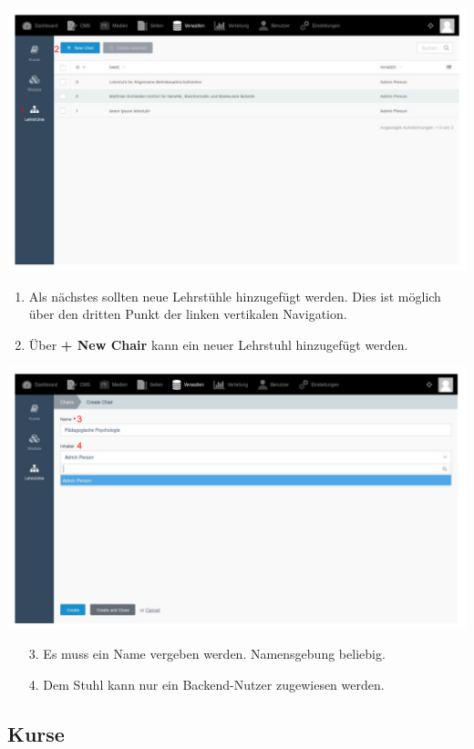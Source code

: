     \includegraphics[scale=0.3]{backend/img/chairs_1.pdf}
    \begin{enumerate}
      \item Als nächstes sollten neue Lehrstühle hinzugefügt werden. Dies ist möglich über den dritten Punkt der linken vertikalen Navigation.
     \item Über \textbf{+ New Chair} kann ein neuer Lehrstuhl hinzugefügt werden. 
    \end{enumerate}

    \includegraphics[scale=0.3]{backend/img/chairs_2.pdf}
    
    \begin{enumerate}
     \item[3.] Es muss ein Name vergeben werden. Namensgebung beliebig.
     \item[4.] Dem Stuhl kann nur ein Backend-Nutzer zugewiesen werden.
    \end{enumerate}

    \subsection{Kurse}
    
